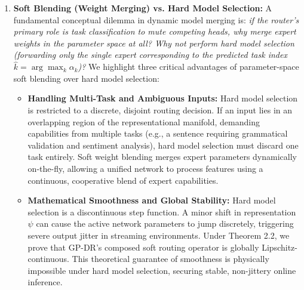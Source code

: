 \begin{enumerate}
\begin{itemize}
        \item \textbf{Robustness Under Real-World Representational Coupling:} Crucially, we emphasize that PFSR's sharp step-boundary is only advantageous under perfectly orthogonal task coordinates ($\gamma = 0.0$). As shown in Section~\ref{sec:coupled_experiments}, under realistic representational coupling (where task representation manifolds share significant overlap, $\gamma \ge 0.50$), GP-DR's smooth Bayesian non-parametric prior generalizes robustly, achieving a highly comparable \textbf{$77.90\%$} Joint Mean accuracy to PFSR SOTA (\textbf{$77.80\%$}). This demonstrates that continuous GPR smoothing acts as an extremely robust regularizer when deploying to realistic, highly blurred deep learning representation spaces, matching the accuracy of SOTA while uniquely enabling safety-critical uncertainty quantification.
    \end{itemize}
    \item \textbf{Soft Blending (Weight Merging) vs. Hard Model Selection:} A fundamental conceptual dilemma in dynamic model merging is: \emph{if the router's primary role is task classification to mute competing heads, why merge expert weights in the parameter space at all? Why not perform hard model selection (forwarding only the single expert corresponding to the predicted task index $\hat{k} = \arg\max_k \alpha_k$)?}
    We highlight three critical advantages of parameter-space soft blending over hard model selection:
    \begin{itemize}
        \item \textbf{Handling Multi-Task and Ambiguous Inputs:} Hard model selection is restricted to a discrete, disjoint routing decision. If an input lies in an overlapping region of the representational manifold, demanding capabilities from multiple tasks (e.g., a sentence requiring grammatical validation and sentiment analysis), hard model selection must discard one task entirely. Soft weight blending merges expert parameters dynamically on-the-fly, allowing a unified network to process features using a continuous, cooperative blend of expert capabilities.
        \item \textbf{Mathematical Smoothness and Global Stability:} Hard model selection is a discontinuous step function. A minor shift in representation $\psi$ can cause the active network parameters to jump discretely, triggering severe output jitter in streaming environments. Under Theorem 2.2, we prove that GP-DR's composed soft routing operator is globally Lipschitz-continuous. This theoretical guarantee of smoothness is physically impossible under hard model selection, securing stable, non-jittery online inference.

\end{itemize}
\end{enumerate}
